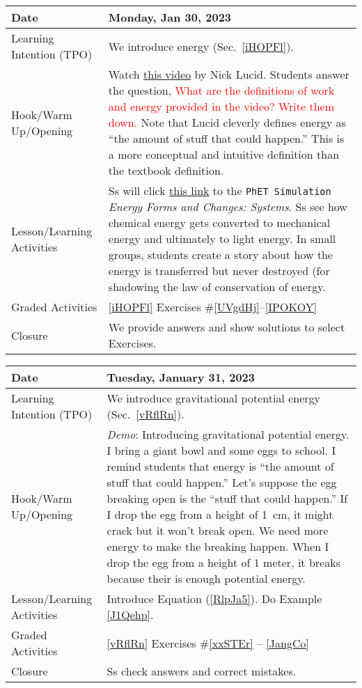 \documentclass[main.tex]{subfiles}
\begin{document}
\begin{tabular}{|m{}|m{}|}
    \hline  
    \cellcolor{black!20}\textbf{Date} &
    \cellcolor{black!20}\textbf{Monday, Jan 30, 2023} \\
    \hline
    Learning Intention (TPO) & We introduce \gls{energy} (Sec.~\ref{iHOPFl}). \\
    \hline
    Hook/Warm Up/Opening & Watch \href{https://youtu.be/snj1wBtn6I8}{this video} by Nick Lucid. Students answer the question, \textcolor{red}{What are the definitions of work and energy provided in the video? Write them down.} Note that Lucid cleverly defines energy as ``the amount of stuff that could happen.'' This is a more conceptual and intuitive definition than the textbook definition.\\
    \hline
    Lesson/Learning Activities & Ss will click \href{https://phet.colorado.edu/sims/html/energy-forms-and-changes/latest/energy-forms-and-changes_en.html}{this link} to the \texttt{PhET Simulation} \textit{Energy Forms and Changes: Systems}. Ss see how chemical energy gets converted to mechanical energy and ultimately to light energy. In small groups, students create a story about how the energy is transferred but never destroyed (for shadowing the \gls{law of conservation of energy}.\\
    \hline
    Graded Activities & \ref{iHOPFl} Exercises \#\ref{UVgdHj}--\ref{IPOKOY} \\
    \hline
    Closure & We provide answers and show solutions to select Exercises.\\
    \hline
\end{tabular}

\begin{tabular}{|m{}|m{}|}
    \hline  
    \cellcolor{black!20}\textbf{Date} &
    \cellcolor{black!20}\textbf{Tuesday, January 31, 2023} \\
    \hline
    Learning Intention (TPO) & We introduce \gls{gravitational potential energy} (Sec.~\ref{vRflRn}). \\
    \hline
    Hook/Warm Up/Opening & \textit{Demo}: Introducing gravitational potential energy. I bring a giant bowl and some eggs to school. I remind students that energy is ``the amount of stuff that could happen.'' Let's suppose the egg breaking open is the ``stuff that could happen.'' If I drop the egg from a height of \SI{1}{cm}, it might crack but it won't break open. We need more energy to make the breaking happen. When I drop the egg from a height of 1 meter, it breaks because their is enough potential energy.\\
    \hline
    Lesson/Learning Activities & Introduce Equation (\ref{RlpJa5}). Do Example \ref{J1Qehp}.\\
    \hline
    Graded Activities & \ref{vRflRn} Exercises \#\ref{xxSTEr} -- \ref{JangCo} \\
    \hline
    Closure & Ss check answers and correct mistakes.\\  
    \hline
\end{tabular}    
\end{document}
